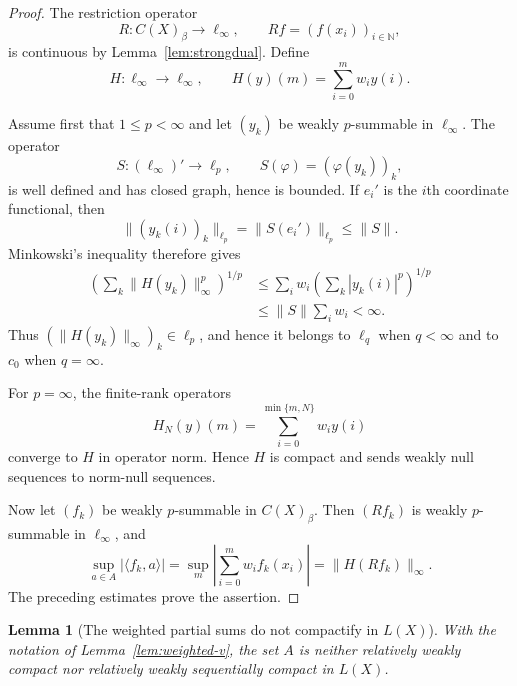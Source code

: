 \documentclass[11pt]{article}
\newtheorem{lemma}[theorem]{Lemma}
\newcommand{\N}{\mathbb N}
\begin{document}
\begin{proof}
The restriction operator
\[
  R:C(X)_\beta\longrightarrow\ell_\infty,
  \qquad Rf=(f(x_i))_{i\in\N},
\]
is continuous by Lemma~\ref{lem:strongdual}.  Define
\[
  H:\ell_\infty\longrightarrow\ell_\infty,
  \qquad
  H(y)(m)=\sum_{i=0}^m w_i y(i).
\]

Assume first that $1\leq p<\infty$ and let $(y_k)$ be weakly $p$-summable in
$\ell_\infty$.  The operator
\[
  S:(\ell_\infty)'\longrightarrow\ell_p,
  \qquad S(\varphi)=(\varphi(y_k))_k,
\]
is well defined and has closed graph, hence is bounded.  If $e_i'$ is the
$i$th coordinate functional, then
\[
  \big\|(y_k(i))_k\big\|_{\ell_p}=\|S(e_i')\|_{\ell_p}\leq\|S\|.
\]
Minkowski's inequality therefore gives
\[
\begin{split}
  \left(\sum_k\|H(y_k)\|_\infty^p\right)^{1/p}
  &\leq
  \sum_i w_i\left(\sum_k|y_k(i)|^p\right)^{1/p}\\
  &\leq \|S\|\sum_iw_i<\infty.
\end{split}
\]
Thus $(\|H(y_k)\|_\infty)_k\in\ell_p$, and hence it belongs to $\ell_q$ when
$q<\infty$ and to $c_0$ when $q=\infty$.

For $p=\infty$, the finite-rank operators
\[
  H_N(y)(m)=\sum_{i=0}^{\min\{m,N\}}w_i y(i)
\]
converge to $H$ in operator norm.  Hence $H$ is compact and sends weakly null
sequences to norm-null sequences.

Now let $(f_k)$ be weakly $p$-summable in $C(X)_\beta$.  Then $(Rf_k)$ is
weakly $p$-summable in $\ell_\infty$, and
\[
  \sup_{a\in A}|\langle f_k,a\rangle|
  =\sup_m\left|\sum_{i=0}^m w_i f_k(x_i)\right|
  =\|H(Rf_k)\|_\infty.
\]
The preceding estimates prove the assertion.
\end{proof}

\begin{lemma}[The weighted partial sums do not compactify in $L(X)$]
\label{lem:weighted-noncompact}
With the notation of Lemma~\ref{lem:weighted-v}, the set $A$ is neither
relatively weakly compact nor relatively weakly sequentially compact in $L(X)$.
\end{lemma}
\end{document}
